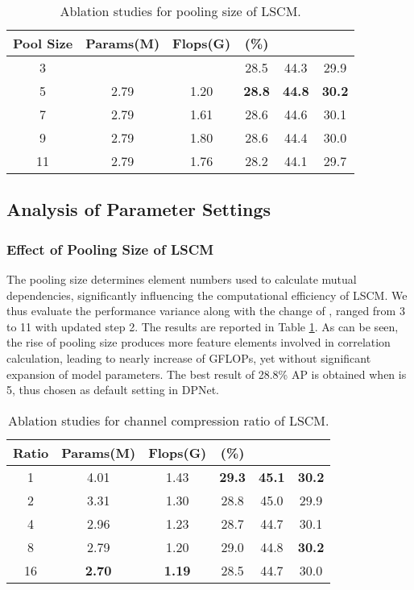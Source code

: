 \documentclass[lettersize,journal]{IEEEtran}
\begin{document}
\begin{table}[t!] 
	\tabcolsep 1.1mm \caption{Ablation studies for pooling size  of LSCM.} 
	\begin{center}
		\begin{tabular}{c|c|c|c|c|c}
			\toprule \multirow{1}{*}{Pool Size } &\multirow{1}{*}{Params(M)}  & \multirow{1}{*}{Flops(G)}& \multirow{1}{*}{(\%)}& \multirow{1}{*}{}& \multirow{1}{*}{}\\ \midrule
			3 & & &28.5 &44.3 &29.9 \\
5 &2.79 &1.20 &\textbf{28.8} &\textbf{44.8} &\textbf{30.2} \\
7  &2.79 &1.61 &28.6 &44.6 &30.1 \\
9  &2.79 &1.80 &28.6 &44.4 &30.0 \\
			11 &2.79 &1.76 &28.2 &44.1 &29.7 \\
\bottomrule
		\end{tabular}\label{tab:poolsize}
	\end{center}	
\end{table} 

\subsection{Analysis of Parameter Settings}
\subsubsection{Effect of Pooling Size  of LSCM}
The pooling size  determines element numbers used to calculate mutual dependencies, significantly influencing the computational efficiency of LSCM. We thus evaluate the performance variance along with the change of , ranged from 3 to 11 with updated step 2. The results are reported in Table \ref{tab:poolsize}. As can be seen, the rise of pooling size  produces more feature elements involved in correlation calculation, leading to nearly  increase of GFLOPs, yet without significant expansion of model parameters. The best result of 28.8\% AP is obtained when  is 5, thus chosen as default setting in DPNet.



\begin{table}[t!] 
	\tabcolsep 1.5mm \caption{Ablation studies for channel compression ratio  of LSCM.} 
	\begin{center}
		\begin{tabular}{c|c|c|c|c|c}
			\toprule \multirow{1}{*}{Ratio } &\multirow{1}{*}{Params(M)}  & \multirow{1}{*}{Flops(G)}& \multirow{1}{*}{(\%)}& \multirow{1}{*}{}& \multirow{1}{*}{}\\ \midrule
			1 &4.01 &1.43  &\textbf{29.3} &\textbf{45.1} &\textbf{30.2} \\
			2 &3.31 &1.30 &28.8 &45.0 &29.9  \\
4 &2.96 &1.23 &28.7 &44.7 &30.1  \\
8 &2.79 &1.20 &29.0 &44.8 &\textbf{30.2} \\
16 &\textbf{2.70} &\textbf{1.19} &28.5 &44.7 &30.0 \\
\bottomrule
		\end{tabular}\label{tab:reduceratio}
	\end{center}	
\end{table} 
\end{document}
